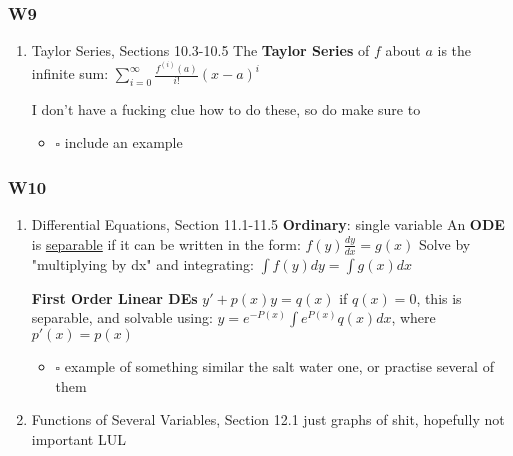 \documentclass[11pt]{article}
\begin{document}
\subsubsection{W9}
\label{sec-1-1-2}
\begin{enumerate}
\item Taylor Series, Sections 10.3-10.5
\label{sec-1-1-2-1}
The \textbf{Taylor Series} of $f$ about $a$ is the infinite sum:
$\sum^{\infty}_{i=0}\frac{f^{(i)}(a)}{i!}(x-a)^{i}$ 

I don't have a fucking clue how to do these, so do make sure to 
\begin{itemize}
\item $\square$ include an example
\end{itemize}
\end{enumerate}
\subsubsection{W10}
\label{sec-1-1-3}
\begin{enumerate}
\item Differential Equations, Section 11.1-11.5
\label{sec-1-1-3-1}
\textbf{Ordinary}: single variable
An \textbf{ODE} is \uline{separable} if it can be written in the form:
$f(y)\frac{dy}{dx}=g(x)$
Solve by "multiplying by dx" and integrating:
$\int{f(y)dy}=\int{g(x)dx}$

\textbf{First Order Linear DEs}
$y'+p(x)y=q(x)$
if $q(x)=0$, this is separable, and solvable using:
$y=e^{-P(x)}\int{e^{P(x)}q(x)dx}$, where $p'(x)=p(x)$

\begin{itemize}
\item $\square$ example of something similar the salt water one, or practise several of them
\end{itemize}
\item Functions of Several Variables, Section 12.1
\label{sec-1-1-3-2}
just graphs of shit, hopefully not important LUL
\end{enumerate}
\end{document}
